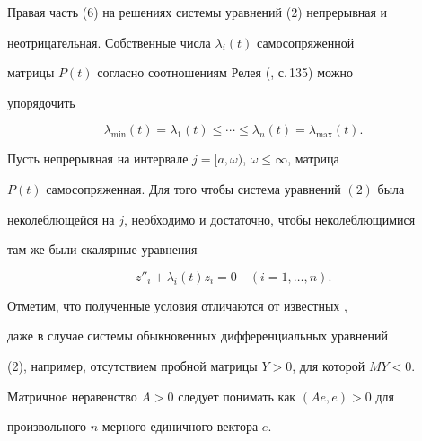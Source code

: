 Правая часть (6) на решениях системы уравнений (2) непрерывная и 


неотрицательная. Собственные числа $\lambda_i(t)$ самосопряженной 


матрицы $P(t)$ согласно соотношениям Релея (\cite{1}, с.\,135) можно 


упорядочить 


\begin{equation} 


\lambda_{\min}(t)=\lambda_1(t)\le\dotsb\le\lambda_n(t)= 


\lambda_{\max}(t). 


\end{equation} 


 


\begin{thm} 


Пусть непрерывная на интервале $j=[a,\omega)$, $\omega\le\infty$, матрица 


$P(t)$ самосопряженная. Для того чтобы система уравнений $(2)$ была 


неколеблющейся на $j$, необходимо и достаточно, чтобы неколеблющимися 


там же были скалярные уравнения 


\begin{equation} 


z''_i+\lambda_i(t)z_i=0\quad(i=1,\dotsc,n). 


\end{equation} 


\end{thm} 


 


Отметим, что полученные условия отличаются от известных \cite{2}, 


\cite{3} даже в случае системы обыкновенных дифференциальных уравнений 


(2), например, отсутствием пробной матрицы $Y>0$, для которой $MY<0$. 


Матричное неравенство $A>0$ следует понимать как $(Ae,e)>0$ для 


произвольного $n$-мерного единичного вектора $e$. 


 


